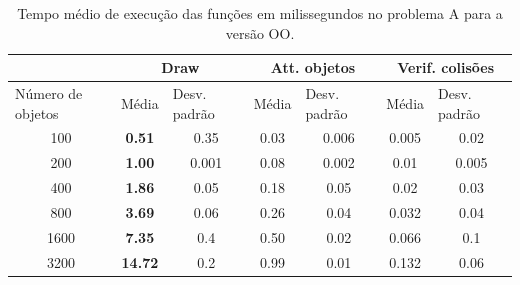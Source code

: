 \begin{table}[h!]
\centering
\caption{Tempo médio de execução das funções em milissegundos no problema A para a versão OO.}
\label{oodv1table}
\begin{tabular}{c|cc|cc|cc}
\cline{2-7}
                                       & \multicolumn{2}{c|}{Draw}                                     & \multicolumn{2}{c|}{Att. objetos}                              & \multicolumn{2}{c}{Verif. colisões}                \\ \hline
\multicolumn{1}{l|}{Número de objetos} & \multicolumn{1}{l}{Média} & \multicolumn{1}{l|}{Desv. padrão} & \multicolumn{1}{l}{Média} & \multicolumn{1}{l|}{Desv. padrão} & Média           & \multicolumn{1}{l}{Desv. padrão} \\ \hline
100                                     & \textbf{0.51}              & 0.35                             & 0.03                    & 0.006                                 & 0.005           & 0.02                              \\ \hline
200                                     & \textbf{1.00}              & 0.001                            & 0.08                    & 0.002                                 & 0.01            & 0.005                             \\ \hline
400                                     & \textbf{1.86}              & 0.05                             & 0.18                    & 0.05                                  & 0.02            & 0.03                              \\ \hline
800                                     & \textbf{3.69}              & 0.06                             & 0.26                    & 0.04                                  & 0.032           & 0.04                              \\ \hline
1600                                    & \textbf{7.35}              & 0.4                              & 0.50                    & 0.02                                  & 0.066           & 0.1                               \\ \hline
3200                                    & \textbf{14.72}             & 0.2                              & 0.99                    & 0.01                                  & 0.132           & 0.06                              \\ \hline
\end{tabular}
\end{table}

